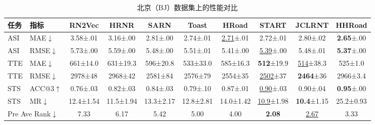 \begin{table}[H]
    \centering
    \caption{北京（BJ）数据集上的性能对比}
    \label{tab:HHRoad_bj}
    \small
    \setlength{\tabcolsep}{3pt}
    \begin{tabular}{ll|cccccccc}
        \hline
        \textbf{任务} & \textbf{指标} & \textbf{RN2Vec} & \textbf{HRNR} & \textbf{SARN} & \textbf{Toast} & \textbf{HRoad} & \textbf{START} & \textbf{JCLRNT} & \textbf{HHRoad} \\
        \hline
        ASI & MAE$\downarrow$ & 3.58\tiny{±.01} & 3.16\tiny{±.00} & 2.81\tiny{±.00} & 2.74\tiny{±.01} & \underline{2.71}\tiny{±.01} & 2.72\tiny{±.01} & 2.80\tiny{±.02} & \textbf{2.65}\tiny{±.00} \\
        ASI & RMSE$\downarrow$ & 5.73\tiny{±.00} & 5.59\tiny{±.00} & 5.48\tiny{±.00} & 5.51\tiny{±.01} & 5.41\tiny{±.00} & \underline{5.39}\tiny{±.00} & 5.48\tiny{±.01} & \textbf{5.37}\tiny{±.00} \\
        TTE & MAE$\downarrow$ & 661\tiny{±14.0} & 631\tiny{±19.3} & 596\tiny{±20.8} & 533\tiny{±33.0} & 585\tiny{±16.3} & \textbf{512}\tiny{±19.9} & \underline{514}\tiny{±38.3} & 525\tiny{±1.0} \\
        TTE & RMSE$\downarrow$ & 2978\tiny{±48} & 2968\tiny{±42} & 2581\tiny{±84} & 2576\tiny{±79} & 2554\tiny{±35} & \underline{2502}\tiny{±37} & \textbf{2464}\tiny{±36} & 2966\tiny{±3.4} \\
        STS & ACC@3$\uparrow$ & 0.76\tiny{±.03} & 0.82\tiny{±.03} & 0.84\tiny{±.03} & 0.79\tiny{±.10} & 0.87\tiny{±.01} & \underline{0.90}\tiny{±.03} & 0.90\tiny{±.04} & \textbf{0.95}\tiny{±.00} \\
        STS & MR$\downarrow$ & 12.4\tiny{±1.54} & 11.5\tiny{±1.94} & 13.3\tiny{±2.17} & 12.8\tiny{±2.81} & 14.0\tiny{±1.42} & \underline{10.9}\tiny{±1.98} & \textbf{10.4}\tiny{±1.15} & 25.2\tiny{±0.93} \\
        \hline
        \multicolumn{2}{l|}{Pre Ave Rank$\downarrow$} & 7.33 & 6.17 & 5.42 & 5.00 & 4.00 & \textbf{2.08} & \underline{2.67} & 3.33 \\
        \hline
    \end{tabular}
\end{table}

